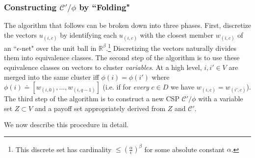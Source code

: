 \subsubsection{Constructing $\mathcal{C}'/\phi$ by ``Folding"}

The algorithm that follows can be broken down into three phases. First, discretize the vectors $u_{(i,c)}$ by identifying each $u_{(i,c)}$ with the closest member $w_{(i,c)}$ of an ``$\epsilon$-net" over the unit ball in $\mathbb{R}^\beta$.\footnote{This discrete set has cardinality $\leq \left(\frac{\alpha}{\epsilon}\right)^{\beta}$ for some absolute constant $\alpha$.} 
Discretizing the vectors naturally divides them into equivalence classes. The second step of the algorithm is to use these equivalence classes on vectors to cluster \textit{variables}. 
At a high level, $i,i' \in V$ are merged into the same cluster iff $\phi(i) = \phi(i')$ where $\phi(i) \doteq [w_{(i,0)},\ldots,w_{(i,q-1)}]$ (i.e. if for \textit{ every } $c\in D$ we have $w_{(i,c)} = w_{(i',c)}$). 
The third step of the algorithm is to construct a new CSP $\mathcal{C}'/\phi$ with a variable set $Z \subset V$ and a payoff set appropriately derived from $Z$ and $\mathcal{C}'$.

We now describe this procedure in detail.

